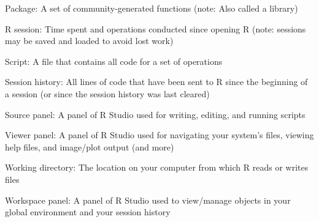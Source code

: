 \documentclass[]{article}
\begin{document}
Package: A set of community-generated functions (note: Also called a
library)

R session: Time spent and operations conducted since opening R (note:
sessions may be saved and loaded to avoid lost work)

Script: A file that contains all code for a set of operations

Session history: All lines of code that have been sent to R since the
beginning of a session (or since the session history was last cleared)

Source panel: A panel of R Studio used for writing, editing, and running
scripts

Viewer panel: A panel of R Studio used for navigating your system's
files, viewing help files, and image/plot output (and more)

Working directory: The location on your computer from which R reads or
writes files

Workspace panel: A panel of R Studio used to view/manage objects in your
global environment and your session history
\end{document}
